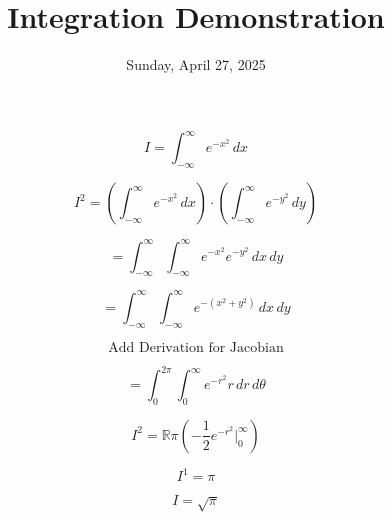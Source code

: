 \documentclass{article}
\begin{document}
\title{Integration Demonstration}
\date{Sunday, April 27, 2025}
\maketitle

\[
I = \int_{-\infty}^{\infty} e^{-x^2} \, dx
\]

\[
I^2 = \left( \int_{-\infty}^{\infty} e^{-x^2} \, dx \right) \cdot \left( \int_{-\infty}^{\infty} e^{-y^2} \, dy \right)
\]

\[
= \int_{-\infty}^{\infty} \int_{-\infty}^{\infty} e^{-x^2} e^{-y^2} \, dx \, dy
\]

\[
= \int_{-\infty}^{\infty} \int_{-\infty}^{\infty} e^{-(x^2+y^2)} \, dx \, dy
\]

\[
\text{Add Derivation for Jacobian}
\]

\[
= \int_{0}^{2\pi} \int_{0}^{\infty} e^{-r^2} r \, dr \, d\theta
\]

\[
I^2 = \mathbb{R} \pi \left( -\frac{1}{2} e^{-r^2} \bigg|_{0}^{\infty} \right)
\]

\[
I^1 = \pi
\]

\[
I = \sqrt{\pi}
\]
\end{document}
